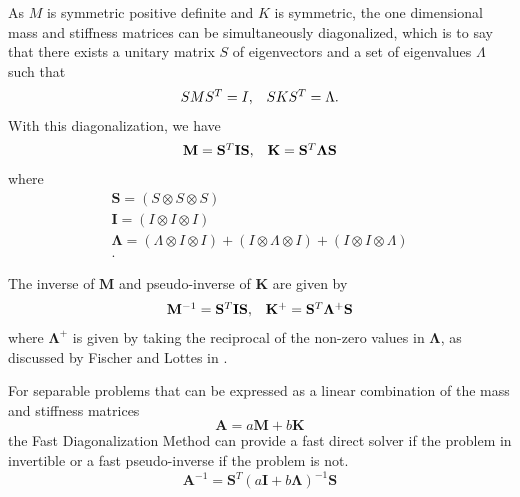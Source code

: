 As $M$ is symmetric positive definite and $K$ is symmetric, the one dimensional mass and stiffness matrices can be simultaneously diagonalized, which is to say that there exists a unitary matrix $S$ of eigenvectors and a set of eigenvalues $\Lambda$ such that
\begin{equation}
\begin{array}{c c}
S M S^T = I,  &  S K S^T = \Lambda.
\end{array}
\end{equation}
With this diagonalization, we have
\begin{equation}
\begin{array}{c c}
\mathbf{M}   = \mathbf{S}^T \mathbf{I} \mathbf{S},  &  \mathbf{K} = \mathbf{S}^T \mathbf{\Lambda} \mathbf{S}  \\
\end{array}
\end{equation}
where
\begin{equation}
\begin{array}{c}
\mathbf{S}       = \left( S \otimes S \otimes S \right)  \\
\mathbf{I}       = \left( I \otimes I \otimes I \right)  \\
\mathbf{\Lambda} = \left( \Lambda \otimes I \otimes I \right) + \left( I \otimes \Lambda \otimes I \right) + \left( I \otimes I \otimes \Lambda \right)  \\.
\end{array}
\end{equation}

The inverse of $\mathbf{M}$ and pseudo-inverse of $\mathbf{K}$ are given by
\begin{equation}
\begin{array}{c c}
\mathbf{M}^{-1} = \mathbf{S}^T \mathbf{I} \mathbf{S},  &  \mathbf{K}^{+} = \mathbf{S}^T \mathbf{\Lambda}^{+} \mathbf{S}
\end{array}
\end{equation}
where $\mathbf{\Lambda}^{+}$ is given by taking the reciprocal of the non-zero values in $\mathbf{\Lambda}$, as discussed by Fischer and Lottes in \cite{fischer2005hybrid}.

For separable problems that can be expressed as a linear combination of the mass and stiffness matrices
\begin{equation}
\mathbf{A} = a \mathbf{M} + b \mathbf{K}
\end{equation}
the Fast Diagonalization Method can provide a fast direct solver if the problem in invertible or a fast pseudo-inverse if the problem is not.
\begin{equation}
\mathbf{A}^{-1} = \mathbf{S}^T \left( a \mathbf{I} + b \mathbf{\Lambda} \right)^{-1} \mathbf{S}
\label{eq:fdminverse}
\end{equation}

